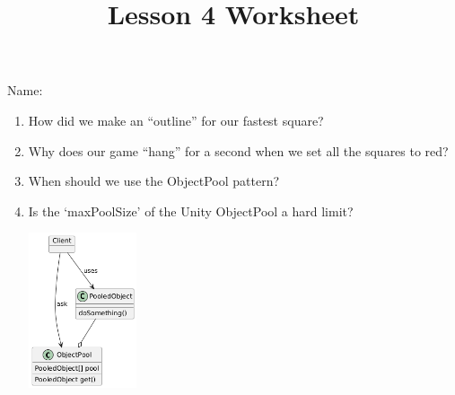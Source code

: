 \documentclass[12pt]{../rhitcsse}
\title{Lesson 4 Worksheet}
\begin{document}
\maketitle

\vspace*{0.15in}\hspace{0.25in}Name:\hrulefill\hspace{0.25in}\hspace{0.25in}

\begin{enumerate}
  \item How did we make an ``outline'' for our fastest square?
  \vfill
  
  \item Why does our game ``hang'' for a second when we set all the squares to red?
  \vfill

  \item When should we use the ObjectPool pattern?
  \vfill

  \item Is the `maxPoolSize' of the Unity ObjectPool a hard limit?
  \vfill

  \clearpage
  \centering  
\includegraphics[width=0.25\textwidth]{../figs/ObjectPool.png}

\end{enumerate}
\end{document}
